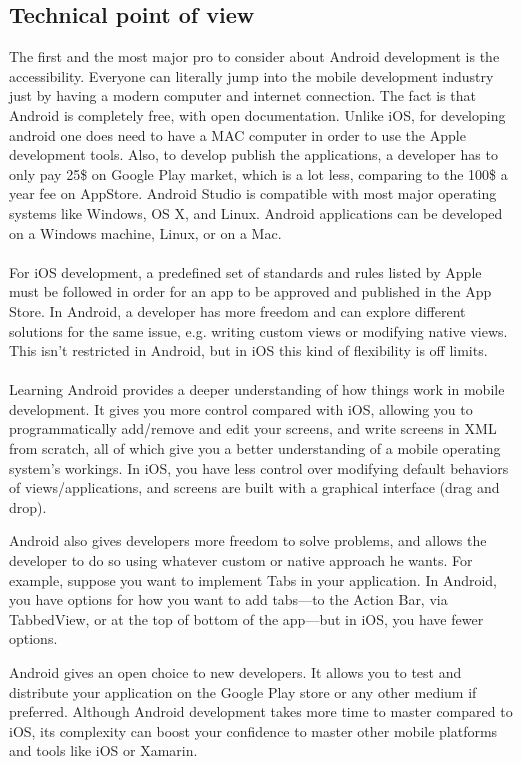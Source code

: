 \documentclass[12pt]{article}
\begin{document}
        \subsection*{Technical point of view}
            The first and the most major pro to consider about Android development is the accessibility. Everyone can literally jump into the mobile development industry just by having a modern computer and internet connection. The fact is that Android is completely free, with open documentation. Unlike iOS, for developing android one does need to have a MAC computer in order to use the Apple development tools. Also, to develop publish the applications, a developer has to only pay 25\$ on Google Play market, which is a lot less, comparing to the 100\$ a year fee on AppStore\cite{androidvsios}. Android Studio is compatible with most major operating systems like Windows, OS X, and Linux. Android applications can be developed on a Windows machine, Linux, or on a Mac.
            \\\\
            For iOS development, a predefined set of standards and rules listed by Apple must be followed in order for an app to be approved and published in the App Store. In Android, a developer has more freedom and can explore different solutions for the same issue, e.g. writing custom views or modifying native views. This isn’t restricted in Android, but in iOS this kind of flexibility is off limits. 
            \\\\
            Learning Android provides a deeper understanding of how things work in mobile development. It gives you more control compared with iOS, allowing you to programmatically add/remove and edit your screens, and write screens in XML from scratch, all of which give you a better understanding of a mobile operating system’s workings. In iOS, you have less control over modifying default behaviors of views/applications, and screens are built with a graphical interface (drag and drop).

            Android also gives developers more freedom to solve problems, and allows the developer to do so using whatever custom or native approach he wants. For example, suppose you want to implement Tabs in your application. In Android, you have options for how you want to add tabs—to the Action Bar, via TabbedView, or at the top of bottom of the app—but in iOS, you have fewer options.

            Android gives an open choice to new developers. It allows you to test and distribute your application on the Google Play store or any other medium if preferred. Although Android development takes more time to master compared to iOS, its complexity can boost your confidence to master other mobile platforms and tools like iOS or Xamarin\cite{android2}.
\end{document}
